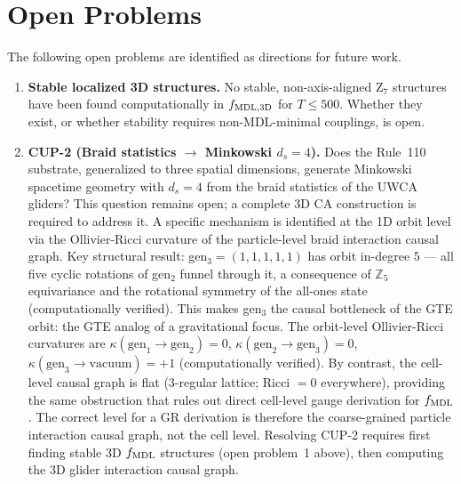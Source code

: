 \documentclass[11pt]{article}
\theoremstyle{remark}
\begin{document}
\section{Open Problems}
\label{sec:open}

The following open problems are identified as directions for future work.

\begin{enumerate}

\item \textbf{Stable localized 3D structures.}
No stable, non-axis-aligned Z$_7$ structures have been found computationally in
$f_{\rm MDL, 3D}$ for $T \leq 500$. Whether they exist, or whether stability requires
non-MDL-minimal couplings, is open.

\item \textbf{CUP-2 (Braid statistics $\to$ Minkowski $d_s = 4$).}
Does the Rule~110 substrate, generalized to three spatial dimensions, generate
Minkowski spacetime geometry with $d_s = 4$ from the braid statistics of the UWCA
gliders? This question remains open; a complete 3D CA construction is required to address it.
A specific mechanism is identified at the 1D orbit level via the Ollivier-Ricci
curvature of the particle-level braid interaction causal graph.
Key structural result: gen$_3 = (1,1,1,1,1)$ has orbit in-degree $5$ --- all five cyclic
rotations of gen$_2$ funnel through it, a consequence of $\mathbb{Z}_5$ equivariance
and the rotational symmetry of the all-ones state (computationally verified).
This makes gen$_3$ the causal bottleneck of the GTE orbit: the GTE analog of a
gravitational focus.
The orbit-level Ollivier-Ricci curvatures are $\kappa(\text{gen}_1\!\to\!\text{gen}_2)=0$,
$\kappa(\text{gen}_2\!\to\!\text{gen}_3)=0$, $\kappa(\text{gen}_3\!\to\!\text{vacuum})=+1$ (computationally verified).
By contrast, the cell-level causal graph is flat (3-regular lattice; Ricci $= 0$ everywhere),
providing the same obstruction that rules out direct cell-level gauge derivation for $f_{\rm MDL}$.
The correct level for a GR derivation is therefore the coarse-grained particle interaction
causal graph, not the cell level.
Resolving CUP-2 requires first finding stable 3D $f_{\rm MDL}$ structures (open
problem~1 above), then computing the 3D glider interaction causal graph.


\end{enumerate}
\end{document}
